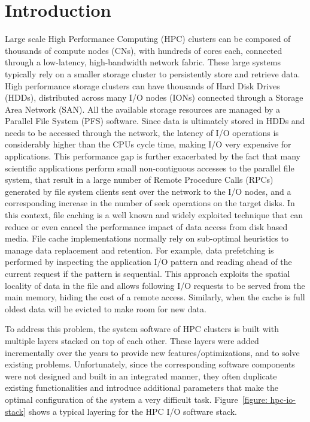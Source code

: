 \chapter{Introduction} \label{cap: introduction}
Large scale High Performance Computing (HPC) clusters can be composed of thousands of compute nodes (CNs), with hundreds of cores each, connected through a low-latency, high-bandwidth
network fabric. These large systems typically rely on a smaller storage cluster to persistently store and retrieve data. High performance storage clusters can have thousands of Hard Disk Drives (HDDs), 
distributed across many I/O nodes (IONs) connected through a Storage Area Network (SAN). All the available storage resources are managed by a Parallel File System (PFS) software. Since data is ultimately
stored in HDDs and needs to be accessed through the network, the latency of I/O operations is considerably higher than the CPUs cycle time, making I/O very expensive for applications.
This performance gap is further exacerbated by the fact that many scientific applications perform small non-contiguous accesses to the parallel file system, that result in a large number of Remote Procedure 
Calls (RPCs) generated by file system clients sent over the network to the I/O nodes, and a corresponding increase in the number of seek operations on the target disks. 
In this context, file caching is a well known and widely exploited technique that can reduce or even cancel the performance impact of data access from disk based media. File cache implementations
normally rely on sub-optimal heuristics to manage data replacement and retention. For example, data prefetching is performed by inspecting the application I/O pattern and reading ahead of the current 
request if the pattern is sequential. This approach exploits the spatial locality of data in the file and allows following I/O requests to be served from the main memory, hiding the cost of a remote access.
Similarly, when the cache is full oldest data will be evicted to make room for new data. 

To address this problem, the system software of HPC clusters is built with multiple layers stacked on top of each other. These layers were added incrementally over the years to provide new 
features/optimizations, and to solve existing problems. Unfortunately, since the corresponding software components were not designed and built in an integrated manner, they often 
duplicate existing functionalities and introduce additional parameters that make the optimal configuration of the system a very difficult task. Figure~\ref{figure: hpc-io-stack} 
shows a typical layering for the HPC I/O software stack.

